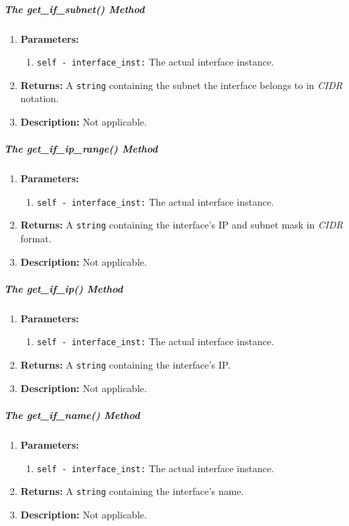         \subparagraph{The get\_if\_subnet() Method}
            \begin{enumerate}
                \item \textbf{Parameters:}
                \begin{enumerate}
                    \item \texttt{self - interface\_inst:} The actual interface instance.
                \end{enumerate}
                \item \textbf{Returns:} A \texttt{string} containing the subnet the interface belongs to in \textit{CIDR} notation.
                \item \textbf{Description:} Not applicable.
            \end{enumerate}

        \subparagraph{The get\_if\_ip\_range() Method}
            \begin{enumerate}
                \item \textbf{Parameters:}
                \begin{enumerate}
                    \item \texttt{self - interface\_inst:} The actual interface instance.
                \end{enumerate}
                \item \textbf{Returns:} A \texttt{string} containing the interface's IP and subnet mask in \textit{CIDR} format.
                \item \textbf{Description:} Not applicable.
            \end{enumerate}

        \subparagraph{The get\_if\_ip() Method}
            \begin{enumerate}
                \item \textbf{Parameters:}
                \begin{enumerate}
                    \item \texttt{self - interface\_inst:} The actual interface instance.
                \end{enumerate}
                \item \textbf{Returns:} A \texttt{string} containing the interface's IP.
                \item \textbf{Description:} Not applicable.
            \end{enumerate}

        \subparagraph{The get\_if\_name() Method}
            \begin{enumerate}
                \item \textbf{Parameters:}
                \begin{enumerate}
                    \item \texttt{self - interface\_inst:} The actual interface instance.
                \end{enumerate}
                \item \textbf{Returns:} A \texttt{string} containing the interface's name.
                \item \textbf{Description:} Not applicable.
            \end{enumerate}


